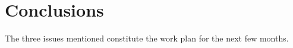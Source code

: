 \documentclass[a4paper,10pt]{article} %
\begin{document}
\begin{comment}

Two common ways to do so are sequential consistency
\cite{lamport1979make} and linearizability \cite{herlihy1990linearizability}. Both require that
the values returned by the operations appear to have
been returned by a sequential execution of the same
operations; sequential consistency only requires this
order to be consistent with the order in which each
individual thread invokes the operations, while linearizability
further requires this order to be consistent
with the real-time order of nonoverlapping operations.

This concept of \emph{'almost-embarrassingly-parallel'} kernel has to be validated.

\end{comment}

\section{Conclusions}

The three issues mentioned constitute the work plan for the next few months.




\end{document}
